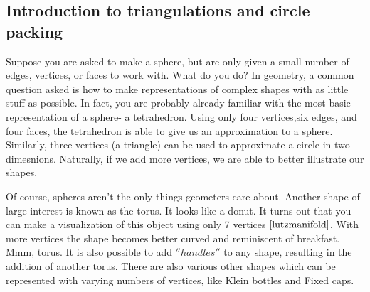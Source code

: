\documentclass[12pt]{article}
\begin{document}
  \subsection{Introduction to triangulations and circle packing}
  \maketitle
  Suppose you are asked to make a sphere, but are only given a small number of edges, vertices, or faces to work with. What do you do? In geometry, a common question asked is how to make representations of complex shapes with as little stuff as possible. In fact, you are probably already familiar with the most basic representation of a sphere- a tetrahedron. Using only four vertices,six edges, and four faces, the tetrahedron is able to give us an approximation to a sphere. Similarly, three vertices (a triangle) can be used to approximate a circle in two dimesnions. Naturally, if we add more vertices, we are able to better illustrate our shapes. \newline
  
   \noindent Of course, spheres aren't the only things geometers care about. Another shape of large interest is known as the torus. It looks like a donut. It turns out that you can make a visualization of this object using only 7 vertices $\cite{lutzmanifold}$. With more vertices the shape becomes better curved and reminiscent of breakfast. Mmm, torus. It is also possible to add $''handles''$ to any shape, resulting in the addition of another torus. There are also various other shapes which can be represented with varying numbers of vertices, like Klein bottles and Fixed caps.\newline
   
\end{document}
